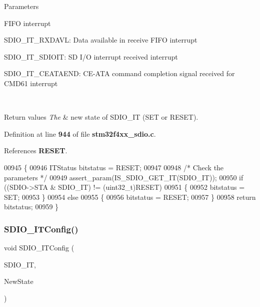 \begin{DoxyParams}{Parameters}
\begin{DoxyItemize}
F\+I\+FO interrupt \item S\+D\+I\+O\+\_\+\+I\+T\+\_\+\+R\+X\+D\+A\+VL\+: Data available in receive F\+I\+FO interrupt \item S\+D\+I\+O\+\_\+\+I\+T\+\_\+\+S\+D\+I\+O\+IT\+: SD I/O interrupt received interrupt \item S\+D\+I\+O\+\_\+\+I\+T\+\_\+\+C\+E\+A\+T\+A\+E\+ND\+: C\+E-\/\+A\+TA command completion signal received for C\+M\+D61 interrupt \end{DoxyItemize}
\\
\hline
\end{DoxyParams}

\begin{DoxyRetVals}{Return values}
{\em The} & new state of S\+D\+I\+O\+\_\+\+IT (S\+ET or R\+E\+S\+ET). \\
\hline
\end{DoxyRetVals}


Definition at line \textbf{ 944} of file \textbf{ stm32f4xx\+\_\+sdio.\+c}.



References \textbf{ R\+E\+S\+ET}.


\begin{DoxyCode}
00945 \{ 
00946   ITStatus bitstatus = RESET;
00947   
00948   \textcolor{comment}{/* Check the parameters */}
00949   assert_param(IS_SDIO_GET_IT(SDIO\_IT));
00950   \textcolor{keywordflow}{if} ((SDIO->STA & SDIO\_IT) != (uint32\_t)RESET)  
00951   \{
00952     bitstatus = SET;
00953   \}
00954   \textcolor{keywordflow}{else}
00955   \{
00956     bitstatus = RESET;
00957   \}
00958   \textcolor{keywordflow}{return} bitstatus;
00959 \}
\end{DoxyCode}
\mbox{\label{group__SDIO__Group7_ga208f51237ef43288735829dbaed37f00}} 
\subsubsection{S\+D\+I\+O\+\_\+\+I\+T\+Config()}
{\footnotesize\ttfamily void S\+D\+I\+O\+\_\+\+I\+T\+Config (\begin{DoxyParamCaption}\item[{uint32\+\_\+t}]{S\+D\+I\+O\+\_\+\+IT,  }\item[{\textbf{ Functional\+State}}]{New\+State }\end{DoxyParamCaption})}



